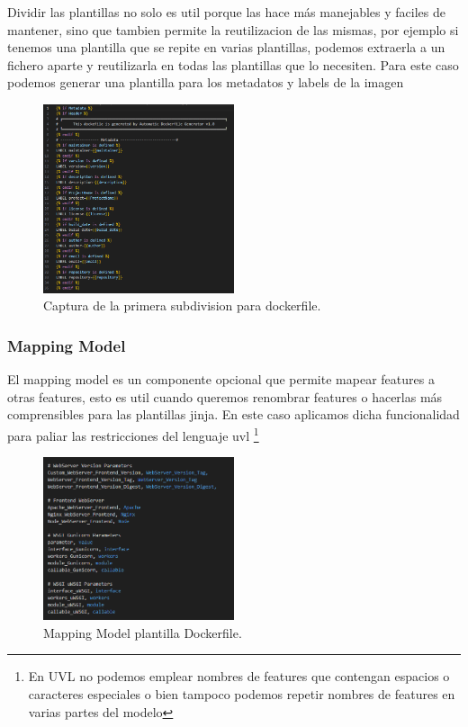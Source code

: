 \documentclass[12pt, a4paper, twoside]{article}
\begin{document}
\newpage
Dividir las plantillas no solo es util porque las hace más manejables y faciles de mantener, sino que tambien permite la reutilizacion de las mismas, por ejemplo si tenemos una plantilla que se repite en varias plantillas, podemos extraerla a un fichero aparte y reutilizarla en todas las plantillas que lo necesiten.
Para este caso podemos generar una plantilla para los metadatos y labels de la imagen 

\begin{figure}[h]
	\centering
	  \includegraphics[width=0.5\textwidth]{dockerfile.metadata.png}
	\caption{Captura de la primera subdivision para dockerfile.}
\end{figure}

\newpage

\subsubsection{Mapping Model}
El mapping model es un componente opcional que permite mapear features a otras features, esto es util cuando queremos renombrar features o hacerlas más comprensibles para las plantillas jinja.
En este caso aplicamos dicha funcionalidad para paliar las restricciones del lenguaje uvl \footnote{En UVL no podemos emplear nombres de features que contengan espacios o caracteres especiales o bien tampoco podemos repetir nombres de features en varias partes del modelo}
\begin{figure}[h]
	\centering
	  \includegraphics[width=0.5\textwidth]{mapping_model_screenshot.png}
	\caption{Mapping Model plantilla Dockerfile.}
\end{figure}
\end{document}
